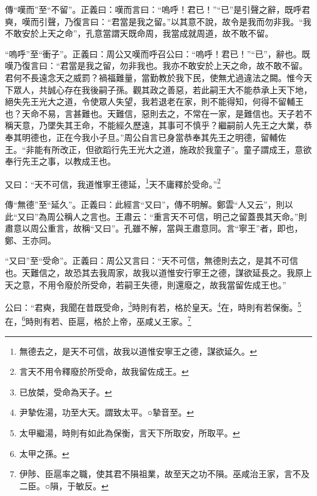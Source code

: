 {\noindent\zhuan{}\fzbyks 傳“嘆而”至“不留”。正義曰：嘆而言曰：“嗚呼！君已！”“已”是引聲之辭，既呼君奭，嘆而引聲，乃復言曰：“君當是我之留。”以其意不說，故令是我而勿非我。“我不敢安於上天之命”，孔意當謂天既命周，我當成就周道，故不敢不留。 \par}

{\noindent\shu{}\fzkt “嗚呼”至“衝子”。正義曰：周公又嘆而呼召公曰：“嗚呼！君已！”“已”，辭也。既嘆乃復言曰：“君當是我之留，勿非我也。我亦不敢安於上天之命，故不敢不留。君何不長遠念天之威罰？禍福難量，當勤教於我下民，使無尤過違法之闕。惟今天下眾人，共誠心存在我後嗣子孫。觀其政之善惡，若此嗣王大不能恭承上天下地，絕失先王光大之道，令使眾人失望，我若退老在家，則不能得知，何得不留輔王也？天命不易，言甚難也。天難信，惡則去之，不常在一家，是難信也。天子若不稱天意，乃墜失其王命，不能經久歷遠，其事可不慎乎？繼嗣前人先王之大業，恭奉其明德也，正在今我小子旦。”周公自言已身當恭奉其先王之明德，留輔佐王。“非能有所改正，但欲蹈行先王光大之道，施政於我童子”。童子謂成王，意欲奉行先王之事，以教成王也。 \par}

又曰：“天不可信，我道惟寧王德延，\footnote{無德去之，是天不可信，故我以道惟安寧王之德，謀欲延久。}天不庸釋於受命。”\footnote{言天不用令釋廢於所受命，故我留佐成王。}


{\noindent\zhuan{}\fzbyks 傳“無德”至“延久”。正義曰：此經言“又曰”，傳不明解。鄭雲“人又云”，則以此“又曰”為周公稱人之言也。王肅云：“重言天不可信，明己之留蓋畏其天命。”則肅意以周公重言，故稱“又曰”。孔雖不解，當與王肅意同。言“寧王”者，即也，鄭、王亦同。 \par}

{\noindent\shu{}\fzkt “又曰”至“受命”。正義曰：周公又言曰：“天不可信，無德則去之，是其不可信也。天難信之，故恐其去我周家，故我以道惟安行寧王之德，謀欲延長之。我原上天之意，不用令廢於所受命，若嗣王失德，則還廢之，故我當留佐成王也。” \par}

公曰：“君奭，我聞在昔既受命，\footnote{已放桀，受命為天子。}時則有若，格於皇天。\footnote{尹摯佐湯，功至大天。謂致太平。○摯音至。}在，時則有若保衡。\footnote{太甲繼湯，時則有如此為保衡，言天下所取安，所取平。}在，\footnote{太甲之孫。}時則有若、臣扈，格於上帝，巫咸乂王家。\footnote{伊陟、臣扈率之職，使其君不隕祖業，故至天之功不隕。巫咸治王家，言不及二臣。○隕，于敏反。}


